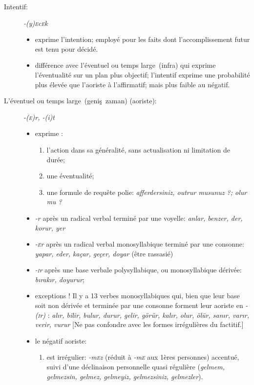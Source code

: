 \documentclass{cours}
\newcommand{\ch}{\c{s}}
\newcommand{\sci}{\textsc{i}}
\newcommand{\sce}{\textsc{e}}
\begin{document}
\begin{description}
    \item [Intentif:] {\sl -(y)\sce c\sce k}
          \begin{itemize}
              \item exprime l'intention; employé pour les faits dont l'accomplissement futur est tenu pour décidé.
              \item différence avec l'éventuel ou \og temps large\fg\ (infra) qui exprime l'éventualité sur un plan plus objectif; l'intentif exprime une probabilité plus élevée que l'aoriste à l'affirmatif; mais plus faible au négatif.
          \end{itemize}
    \item [L'éventuel ou \og temps large\fg\ (geni\ch\ zaman) (aoriste):] \textsl{-(\sce)r, -(i)t}
          \begin{itemize}
              \item exprime :
                    \begin{enumerate}
                        \item l'action dans sa généralité, sans actualisation ni limitation de durée;
                        \item une éventualité;
                        \item une formule de requête polie: \textsl{afferdersiniz, outrur musunuz ?; olur mu ?}
                    \end{enumerate}
              \item \textsl{-r} après un radical verbal terminé par une voyelle: \textsl{anlar, benzer, der, korur, yer}
              \item \textsl{-\sce r} après un radical verbal monosyllabique terminé par une consonne: \textsl{yapar, eder, kaçar, geçer, doyar} (être rassasié)
              \item \textsl{-\sci r} après une base verbale polysyllabique, ou monosyllabique dérivée: \textsl{b\i rak\i r, doyurur};
              \item exceptions ! Il y a 13 verbes monosyllabiques qui, bien que leur base soit non dérivée et terminée par une consonne forment leur aoriste en \textsl{-(\sci r)} : \textsl{al\i r, bilir, bulur, durur, gelir, görür, kal\i r, olur, ölür, san\i r, var\i r, verir, vurur} [Ne pas confondre avec les formes irrégulières du factitif.]
              \item le négatif aoriste:
                    \begin{enumerate}
                        \item est irrégulier: \textsl{-m\sce z} (réduit à \textsl{-m\sce} aux 1ères personnes) accentué, suivi d'une déclinaison personnelle quasi régulière (\textsl{gelmem, gelmezsin, gelmez, gelmeyiz, gelmezsiniz, gelmezler}).

\end{enumerate}
\end{itemize}
\end{description}
\end{document}
